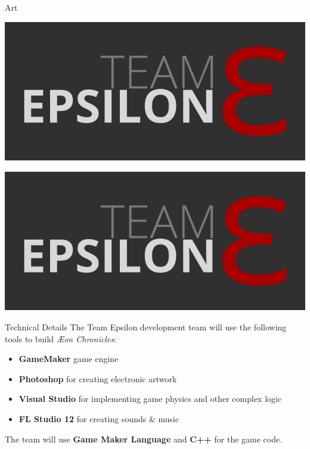 \documentclass{teamepsilon}
\begin{document}
\begin{frame}{Art}

    \begin{minipage}{0.65\textwidth}
        \includegraphics[width=\textwidth]{../logo/team-epsilon.png}
    \end{minipage}%

    \begin{minipage}{0.35\textwidth}
        \includegraphics[width=\textwidth]{../logo/team-epsilon.png}
    \end{minipage}

\end{frame}

\begin{frame}{Technical Details}
    The Team Epsilon development team will use the following tools to build
    \textit{{\AE}on Chronicles}:

    \begin{itemize}
        \item \textbf{GameMaker} game engine
        \item \textbf{Photoshop} for creating electronic artwork
        \item \textbf{Visual Studio} for implementing game physics and other
            complex logic
        \item \textbf{FL Studio 12} for creating sounds \& music
    \end{itemize}

    The team will use \textbf{Game Maker Language} and \textbf{C++} for the game
    code.
\end{frame}
\end{document}
